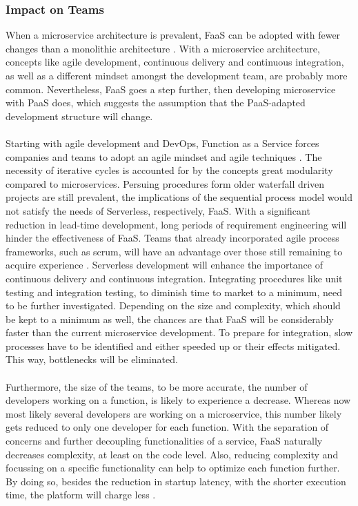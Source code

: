 \documentclass[a4paper,twoside,11pt, pagesize]{scrartcl}
\begin{document}
\begin{spacing}{1.2}
\subsubsection{Impact on Teams}When a microservice architecture is prevalent, FaaS can be adopted with fewer changes than a monolithic architecture \cite{fox2017status}. With a microservice architecture, concepts like agile development, continuous delivery and continuous integration, as well as a different mindset amongst the development team, are probably more common. Nevertheless, FaaS goes a step further, then developing microservice with PaaS does, which suggests the assumption that the PaaS-adapted development structure will change.\\\\ Starting with agile development and \glqq DevOps\grqq{}, Function as a Service forces companies and teams to adopt an agile mindset and agile techniques \cite{benlian2018transformative}. The necessity of iterative cycles is accounted for by the concepts great modularity compared to microservices. Persuing procedures form older waterfall driven projects are still prevalent, the implications of the sequential process model would not satisfy the needs of Serverless, respectively, FaaS. With a significant reduction in lead-time development, long periods of requirement engineering will hinder the effectiveness of FaaS. Teams that already incorporated agile process frameworks, such as scrum, will have an advantage over those still remaining to acquire experience \cite{battleson2016achieving}. Serverless development will enhance the importance of continuous delivery and continuous integration. Integrating procedures like unit testing and integration testing, to diminish time to market to a minimum, need to be further investigated. Depending on the size and complexity, which should be kept to a minimum as well, the chances are that FaaS will be considerably faster than the current microservice development. To prepare for integration, slow processes have to be identified and either speeded up or their effects mitigated. This way, bottlenecks will be eliminated.\\\\ Furthermore, the size of the teams, to be more accurate, the number of developers working on a function, is likely to experience a decrease. Whereas now most likely several developers are working on a microservice, this number likely gets reduced to only one developer for each function. With the separation of concerns and further decoupling functionalities of a service, FaaS naturally decreases complexity, at least on the code level. Also, reducing complexity and focussing on a specific functionality can help to optimize each function further. By doing so, besides the reduction in startup latency, with the shorter execution time, the platform will charge less \cite{shafiei2020serverless}.\\\\ 

\end{spacing}
\end{document}
